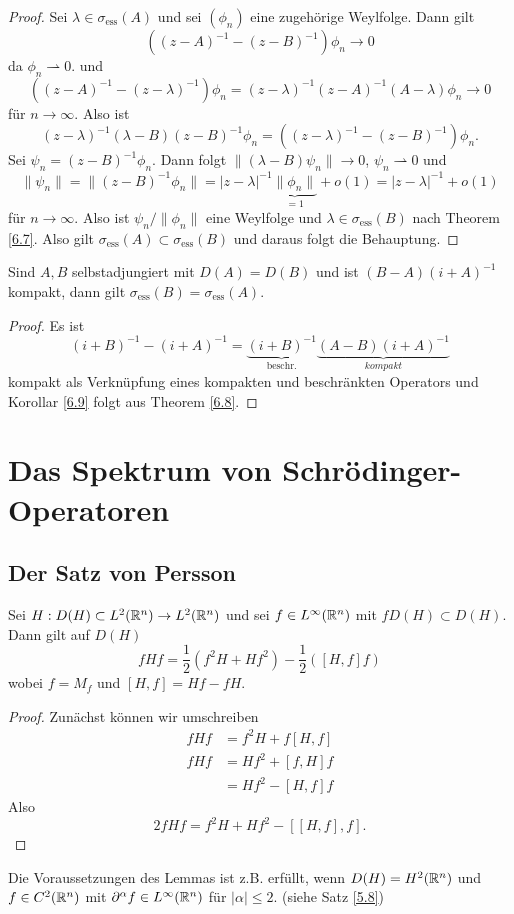 \documentclass{mycourse}
\begin{document}
\begin{proof}
Sei $\lambda\in \sigma_{\text{ess}} (A)$ und sei $(\phi_n)$ eine zugehörige Weylfolge. Dann gilt
\[
((z-A)^{-1} - (z-B)^{-1})\phi_n \to 0
\]
da $\phi_n \rightharpoonup 0$. und
\[
((z-A)^{-1} - (z-\lambda)^{-1}) \phi_n = (z-\lambda)^{-1} (z-A)^{-1} (A- \lambda) \phi_n \to 0
\]
für $n\to \infty$. Also ist
\[
 (z-\lambda)^{-1} (\lambda- B) (z-B)^{-1} \phi_n = ((z-\lambda)^{-1} - (z-B)^{-1}) \phi_n. 
\]
Sei $\psi_n = (z-B)^{-1} \phi_n$. Dann folgt $\|(\lambda-B)\psi_n\| \to 0$, $\psi_n \rightharpoonup 0$ und
\[
\| \psi_n\| = \| (z- B)^{-1} \phi_n\| = |z-\lambda|^{-1} \underbrace{\| \phi_n \|}_{=1} + o(1)= |z-\lambda|^{-1} +o(1)
\]
für $n\to \infty$. Also ist $\psi_n/\|\phi_n\|$ eine Weylfolge und $\lambda \in \sigma_{\text{ess}} (B)$ nach Theorem \ref{6.7}. Also gilt $\sigma_{\text{ess}}(A) \subset \sigma_{\text{ess}}(B)$ und daraus folgt die Behauptung.
\end{proof}

\begin{kor}\label{6.9}
Sind $A,B$ selbstadjungiert mit $D(A) = D(B)$ und ist $(B-A) (i+A)^{-1}$ kompakt, dann gilt $\sigma_{\text{ess}}(B) = \sigma_{\text{ess}}(A)$.
\end{kor}
\begin{proof}
Es ist
\[
(i+B)^{-1} - (i+A)^{-1} = \underbrace{(i+B)^{-1}}_{\text{beschr.}} \underbrace{(A-B) (i+A)^{-1}}_{kompakt}
\]
kompakt als Verknüpfung eines kompakten und beschränkten Operators und Korollar \ref{6.9} folgt aus Theorem \ref{6.8}. 
\end{proof}

\chapter{Das Spektrum von Schrödinger-Operatoren}\label{7}
\section{Der Satz von Persson}

\begin{lem}\label{7.1}
Sei $H:D(H) \subset L^2(\mathbb{R}^n) \to L^2(\mathbb{R}^n)$ und sei $f\in L^\infty(\mathbb{R}^n)$ mit $fD(H)\subset D(H)$. Dann gilt auf $D(H)$
\[
fHf= \frac{1}{2} (f^2H +Hf^2) - \frac{1}{2} ([H,f]f)
\]
wobei $f= M_f$ und $[H,f] = Hf-fH$. 
\end{lem}
\begin{proof}
Zunächst können wir umschreiben
\begin{align*}
fHf &= f^2 H + f[H,f] \\
fHf &= Hf^2 + [f,H] f \\
&= Hf^2 - [H,f]f
\end{align*}
Also
\[
2 fHf = f^2 H + Hf^2 - [ [H,f],f].
\]
\end{proof}
Die Voraussetzungen des Lemmas ist z.B. erfüllt, wenn $D(H)=H^2(\mathbb{R}^n)$ und $f\in C^2(\mathbb{R}^n)$ mit $\partial^\alpha f \in L^\infty(\mathbb{R}^n)$ für $|\alpha|\le 2$. (siehe Satz \ref{5.8})
\end{document}

